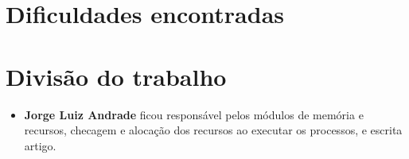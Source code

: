\documentclass[a4paper]{article}
\begin{document}
\section{Dificuldades encontradas}

\section{Divisão do trabalho}
\begin{itemize}
	\item \textbf{Jorge Luiz Andrade} ficou responsável pelos módulos de memória e recursos, checagem e alocação dos recursos ao executar os processos, e escrita artigo.
\end{itemize}



\renewcommand\refname{Bibliografia}

\nocite{*}


\end{document}

